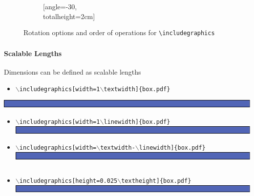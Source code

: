 \documentclass[article]{beamer}
\newcommand{\ic}[2]{\texttt{$\backslash$includegraphics[#1]\{#2\}}}
\begin{document}
\begin{frame}
\begin{figure}[]
\begin{subfigure}[b]{0.3\linewidth}
      \caption{[angle=-30,\\totalheight=2cm]}
    \end{subfigure}
    \caption{Rotation options and order of operations for \texttt{\textbackslash includegraphics}}
  \end{figure}
  \vspace{-24pt}
\end{frame}

\begin{frame}
  \frametitle{\thesubsection}
  \framesubtitle{Scalable Lengths}
  Dimensions can be defined as scalable lengths
  \begin{itemize}
    \item \ic{width=1$\backslash$textwidth}{box.pdf}
  \end{itemize}
        \includegraphics[width=1\textwidth]{box.pdf}
  \begin{itemize}%
    \item \ic{width=1$\backslash$linewidth}{box.pdf}
        \includegraphics[width=1\linewidth]{box.pdf}
    \item \ic{width=$\backslash$textwidth-$\backslash$linewidth}{box.pdf}
        \includegraphics[width=\textwidth-\linewidth]{box.pdf}
  \end{itemize}

  \begin{columns}
    \hfill
  \end{columns}

  \begin{itemize}%
    \item \ic{height=0.025$\backslash$textheight}{box.pdf}
        \includegraphics[height=0.025\textheight]{box.pdf}
  \end{itemize}
\end{frame}
\end{document}
